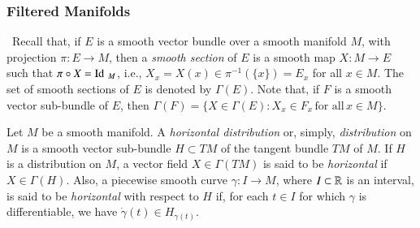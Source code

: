 \documentclass[leqno]{amsart}
\begin{document}
	
	
	
	\subsubsection{Filtered Manifolds}\label{Carnot manifold-section}\
	Recall that, if $E$ is a smooth vector bundle over a smooth manifold $M$, with projection $\pi:E\to M$, then a \textit{smooth section} of $E$ is a smooth map $X:M\to E$ such that $\pi \circ X=\operatorname{Id}\,_M$, i.e., $X_x=X(x)\in \pi^{-1}(\{x\})=E_x$ for all $x\in M$. The set of smooth sections of $E$ is denoted by $\Gamma(E)$. Note that, if $F$ is a smooth vector sub-bundle of $E$, then $\Gamma(F)=\{X\in\Gamma(E) : X_x\in F_x\,\text{for all}\,x\in M\}$.
	
	\begin{definition}
		Let $M$ be a smooth manifold. A \textit{horizontal distribution} or, simply, \textit{distribution} on $M$ is a smooth vector sub-bundle $H\subset TM$ of the tangent bundle $TM$ of $M$. If $H$ is a distribution on $M$, a vector field $X\in\Gamma(TM)$ is said to be \textit{horizontal} if $X\in\Gamma(H)$. Also, a piecewise smooth curve $\gamma:I\to M$, where $I\subset\mathbb{R}$ is an interval, is said to be \textit{horizontal} with respect to $H$ if, for each $t\in I$ for which $\gamma$ is differentiable, we have $\dot\gamma(t)\in H_{\gamma(t)}$.
	\end{definition}
	

	
\end{document}
